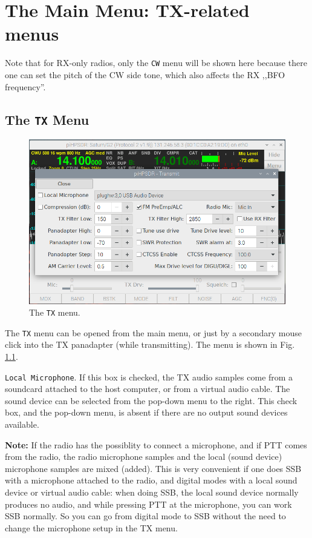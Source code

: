 \documentclass[12pt]{book}
\def\rett#1{\texttt{\color{red}#1}}
\def\bltt#1{\texttt{\color{blue}#1}}
\begin{document}
\chapter{The Main Menu: TX-related menus}

Note that for RX-only radios, only the \bltt{CW} menu will be shown here
because there one can set the pitch of the CW side tone, which also affects
the RX ,,BFO frequency''.

\section{The \texttt{TX} Menu}
\label{sec:txmenu}
\begin{figure}[ht!]
\center
\includegraphics[width=12cm]{TXMenu.png}
\caption{The \bltt{TX} menu.}
\label{fig:TXMenu}
\end{figure}

The \bltt{TX} menu can be opened from the main menu, or just by a secondary mouse click
into the TX panadapter (while transmitting). The menu is shown in Fig. \ref{fig:TXMenu}.


\rett{Local Microphone}. If this box is checked, the TX audio samples come from a soundcard
attached to the host computer, or from a virtual audio cable. The sound device can be
selected from the pop-down menu to the right. 
 This check box, and the pop-down menu, is absent if
there are no output sound devices available.

\textbf{Note:} If the radio has the possiblity
to connect a microphone, and if PTT comes from the radio, the radio microphone samples
and the local (sound device) microphone samples are mixed (added). This is very convenient
if one does SSB with a microphone attached to the radio, and digital modes with a
local sound device or virtual audio cable: when doing SSB, the local sound device normally
produces no audio, and while pressing PTT at the microphone, you can work SSB normally.
So you can go from digital mode to SSB without the need to change the microphone setup
in the TX menu.
\end{document}

